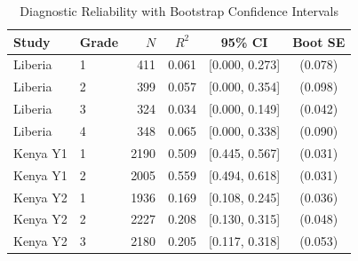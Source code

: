 \begin{table}[htbp]
\centering\small
\caption{Diagnostic Reliability with Bootstrap Confidence Intervals}
\label{tab:reliability_boot}
\begin{tabular}{llrccc}
\toprule
Study & Grade & $N$ & $R^2$ & 95\% CI & Boot SE \\
\midrule
Liberia & 1 & 411 & 0.061 & [0.000, 0.273] & (0.078) \\
Liberia & 2 & 399 & 0.057 & [0.000, 0.354] & (0.098) \\
Liberia & 3 & 324 & 0.034 & [0.000, 0.149] & (0.042) \\
Liberia & 4 & 348 & 0.065 & [0.000, 0.338] & (0.090) \\
Kenya Y1 & 1 & 2190 & 0.509 & [0.445, 0.567] & (0.031) \\
Kenya Y1 & 2 & 2005 & 0.559 & [0.494, 0.618] & (0.031) \\
Kenya Y2 & 1 & 1936 & 0.169 & [0.108, 0.245] & (0.036) \\
Kenya Y2 & 2 & 2227 & 0.208 & [0.130, 0.315] & (0.048) \\
Kenya Y2 & 3 & 2180 & 0.205 & [0.117, 0.318] & (0.053) \\
\bottomrule
\end{tabular}
\par\smallskip{}
\end{table}